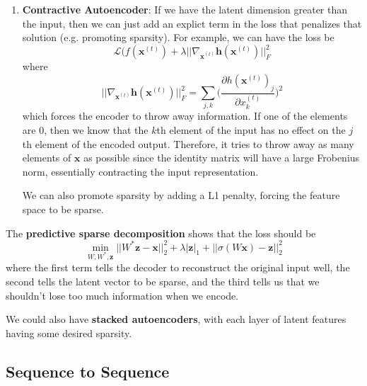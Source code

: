 \documentclass{article}
\begin{document}
\begin{enumerate}
    \item \textbf{Contractive Autoencoder}: If we have the latent dimension greater than the input, then we can just add an explict term in the loss that penalizes that solution (e.g. promoting sparsity). For example, we can have the loss be 
    \[\mathcal{L}(f(\mathbf{x}^{(t)}) + \lambda || \nabla_{\mathbf{x}^{(t)}} \mathbf{h}(\mathbf{x}^{(t)})||^2_F\]
    where 
    \[||\nabla_{\mathbf{x}^{(t)}} \mathbf{h}(\mathbf{x}^{(t)})||_F^2 = \sum_{j, k} \bigg(\frac{\partial h(\mathbf{x}^{(t)})_j}{\partial x_k^{(t)}} \bigg)^2\]
    which forces the encoder to throw away information. If one of the elements are $0$, then we know that the $k$th element of the input has no effect on the $j$th element of the encoded output. Therefore, it tries to throw away as many elements of $\mathbf{x}$ as possible since the identity matrix will have a large Frobenius norm, essentially contracting the input representation.  

    We can also promote sparsity by adding a L1 penalty, forcing the feature space to be sparse. 
  \end{enumerate}

  The \textbf{predictive sparse decomposition} shows that the loss should be 
  \begin{equation}
    \min_{W, W^\ast, \mathbf{z}} ||W^\ast \mathbf{z} - \mathbf{x}||^2_2 + \lambda | \mathbf{z}|_1 + ||\sigma(W \mathbf{x}) - \mathbf{z}||^2_2
  \end{equation}
  where the first term tells the decoder to reconstruct the original input well, the second tells the latent vector to be sparse, and the third tells us that we shouldn't lose too much information when we encode. 

  We could also have \textbf{stacked autoencoders}, with each layer of latent features having some desired sparsity. 

\subsection{Sequence to Sequence}
\end{document}
